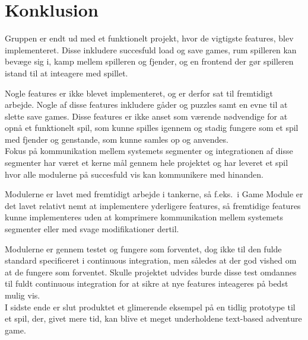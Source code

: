 \section{Konklusion}
Gruppen er endt ud med et funktionelt projekt, hvor de vigtigste features, blev implementeret.
Disse inkludere succesfuld load og save games, rum spilleren kan bevæge sig i, kamp mellem spilleren
og fjender, og en frontend der gør spilleren istand til at inteagere med spillet.

Nogle features er ikke blevet implementeret, og er derfor sat til fremtidigt arbejde.
Nogle af disse features inkludere gåder og puzzles samt en evne til at slette save games.
Disse features er ikke anset som værende nødvendige for at opnå et funktionelt spil, som kunne spilles
igennem og stadig fungere som et spil med fjender og genstande, som kunne samles op og anvendes.\\

\noindent Fokus på kommunikation mellem systemets segmenter og integrationen af disse segmenter har været
et kerne mål gennem hele projektet og har leveret et spil hvor alle modulerne på succesfuld vis kan 
kommunikere med hinanden. 

Modulerne er lavet med fremtidigt arbejde i tankerne, så f.eks.\ i Game Module er det lavet relativt nemt 
at implementere yderligere features, så fremtidige features kunne implementeres uden at komprimere 
kommunikation mellem systemets segmenter eller med svage modifikationer dertil.

Modulerne er gennem testet og fungere som forventet, dog ikke til den fulde standard specificeret i 
continuous integration, men således at der god vished om at de fungere som forventet. Skulle projektet
udvides burde disse test omdannes til fuldt continuous integration for at sikre at nye features
inteageres på bedst mulig vis.\\

I sidste ende er slut produktet et glimerende eksempel på en tidlig prototype til et spil, der, givet mere
tid, kan blive et meget underholdene text-based adventure game.

\newpage
